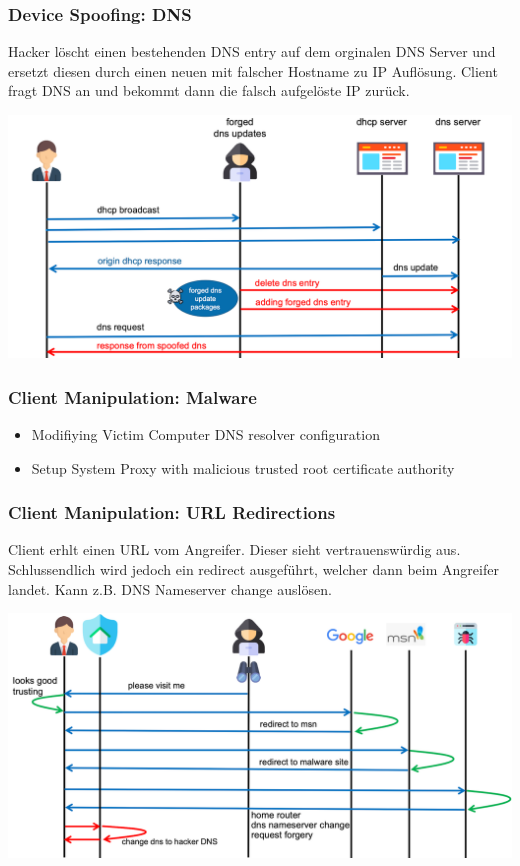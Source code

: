 \subsubsection{Device Spoofing: DNS}
Hacker löscht einen bestehenden DNS entry auf dem orginalen DNS Server und ersetzt diesen durch einen neuen mit falscher Hostname zu IP Auflösung. Client fragt DNS an und bekommt dann die falsch aufgelöste IP zurück.
\begin{center}
    \vspace{-8pt}
    \includegraphics[width=1.0\linewidth]{./img/09-mitm/dns}
    \vspace{-8pt}
\end{center}
\subsubsection{Client Manipulation: Malware}
\begin{itemize}
    \item Modifiying Victim Computer DNS resolver configuration
    \item Setup System Proxy with malicious trusted root certificate authority
\end{itemize}
\subsubsection{Client Manipulation: URL Redirections}
Client erhlt einen URL vom Angreifer. Dieser sieht vertrauenswürdig aus. Schlussendlich wird jedoch ein redirect ausgeführt, welcher dann beim Angreifer landet. Kann z.B. DNS Nameserver change auslösen.
\begin{center}
    \vspace{-8pt}
    \includegraphics[width=1.0\linewidth]{./img/09-mitm/redirecting}
    \vspace{-8pt}
\end{center}

